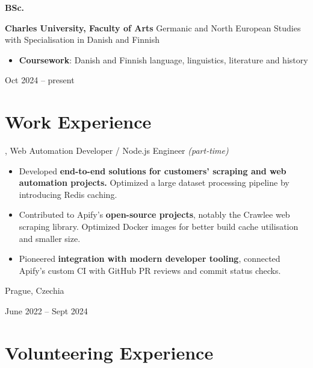 \documentclass[10pt, a4paper]{article}
\newenvironment{highlights}{
    \begin{itemize}[
        topsep=0.08 cm,
        parsep=0.05 cm,
        partopsep=0pt,
        itemsep=0pt,
        leftmargin=0.4 cm + 10pt
    ]
}{
    \end{itemize}
} %
\newenvironment{twocolentry}[2][]{
    \onecolentry
    \def\secondColumn{#2}
    \setcolumnwidth{\fill, 4.2 cm}
    \begin{paracol}{2}
}{
    \switchcolumn \raggedleft \secondColumn
    \end{paracol}
    \endonecolentry
} %
\newenvironment{threecolentry}[3][]{
    \onecolentry
    \def\thirdColumn{#3}
    \setcolumnwidth{1 cm, \fill, 4.2 cm}
    \begin{paracol}{3}
    {\raggedright #2} \switchcolumn
}{
    \switchcolumn \raggedleft \thirdColumn
    \end{paracol}
    \endonecolentry
} %
\let\hrefWithoutArrow\href
\renewcommand{\href}[2]{\hrefWithoutArrow{#1}{\ifthenelse{\equal{#2}{}}{ }{#2 }\raisebox{.15ex}{\footnotesize \faExternalLink*}}}
\begin{document}
        \vspace{0.2 cm}

        \begin{threecolentry}{\textbf{BSc.}}{
            Oct 2024 – present
        }
            \textbf{Charles University, Faculty of Arts} \newline Germanic and North European Studies with Specialisation in Danish and Finnish
            \begin{highlights}
                \item \textbf{Coursework}: Danish and Finnish language, linguistics, literature and history
            \end{highlights}
        \end{threecolentry}


    
    \section{Work Experience}



        
        \begin{twocolentry}{
            Prague, Czechia

        June 2022 – Sept 2024
        }
            \textbf{\href{https://apify.com/about}{Apify}}, Web Automation Developer / Node.js Engineer \textit{(part-time)}
            \begin{highlights}
                \item Developed \textbf{end-to-end solutions for customers' scraping and web automation projects.} Optimized a large dataset processing pipeline by introducing Redis caching.
                \item Contributed to Apify's \textbf{open-source projects}, notably the Crawlee web scraping library. Optimized Docker images for better build cache utilisation and smaller size.
                \item Pioneered \textbf{integration with modern developer tooling}, connected Apify's custom CI with GitHub PR reviews and commit status checks.
            \end{highlights}
        \end{twocolentry}



    
    \section{Volunteering Experience}
\end{document}
